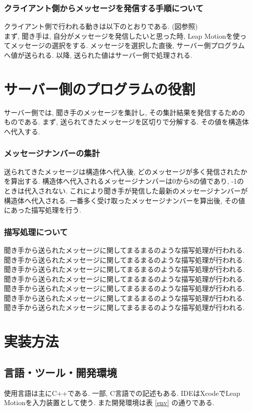 \documentclass{funthesis}
\begin{document}
\subsubsection{クライアント側からメッセージを発信する手順について}
クライアント側で行われる動きは以下のとおりである. (図参照)\\
まず, 聞き手は, 自分がメッセージを発信したいと思った時, Leap Motionを使ってメッセージの選択をする. メッセージを選択した直後, サーバー側プログラムへ値が送られる. 以降, 送られた値はサーバー側で処理される. 


\section{サーバー側のプログラムの役割}

サーバー側では, 聞き手のメッセージを集計し,  その集計結果を発信するためのものである.
まず, 送られてきたメッセージを区切りで分解する. その値を構造体へ代入する. 
\subsubsection{メッセージナンバーの集計}
送られてきたメッセージは構造体へ代入後, どのメッセージが多く発信されたかを算出する. 構造体へ代入されるメッセージナンバーは0から8の値であり, -1のときは代入されない. これにより聞き手が発信した最新のメッセージナンバーが構造体へ代入される. 一番多く受け取ったメッセージナンバーを算出後, その値にあった描写処理を行う.  

\subsubsection{描写処理について}
聞き手から送られたメッセージに関してまるまるのような描写処理が行われる.聞き手から送られたメッセージに関してまるまるのような描写処理が行われる.聞き手から送られたメッセージに関してまるまるのような描写処理が行われる.聞き手から送られたメッセージに関してまるまるのような描写処理が行われる.聞き手から送られたメッセージに関してまるまるのような描写処理が行われる.聞き手から送られたメッセージに関してまるまるのような描写処理が行われる.聞き手から送られたメッセージに関してまるまるのような描写処理が行われる.


\section{実装方法}

\subsection{言語・ツール・開発環境}
使用言語は主にC++である. 一部, C言語での記述もある. IDEはXcodeでLeap Motionを入力装置として使う. また開発環境は表 \ref{env} の通りである. 
\end{document}

